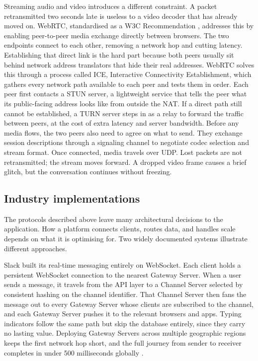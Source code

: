 \documentclass[12pt,a4paper]{article}
\begin{document}
Streaming audio and video introduces a different constraint. A packet retransmitted two seconds late is useless to a video decoder that has already moved on. WebRTC, standardised as a W3C Recommendation \citep{jennings2025}, addresses this by enabling peer-to-peer media exchange directly between browsers. The two endpoints connect to each other, removing a network hop and cutting latency. Establishing that direct link is the hard part because both peers usually sit behind network address translators that hide their real addresses. WebRTC solves this through a process called ICE, Interactive Connectivity Establishment, which gathers every network path available to each peer and tests them in order. Each peer first contacts a STUN server, a lightweight service that tells the peer what its public-facing address looks like from outside the NAT. If a direct path still cannot be established, a TURN server steps in as a relay to forward the traffic between peers, at the cost of extra latency and server bandwidth. Before any media flows, the two peers also need to agree on what to send. They exchange session descriptions through a signaling channel to negotiate codec selection and stream format. Once connected, media travels over UDP. Lost packets are not retransmitted; the stream moves forward. A dropped video frame causes a brief glitch, but the conversation continues without freezing.

\subsection{Industry implementations}

The protocols described above leave many architectural decisions to the application. How a platform connects clients, routes data, and handles scale depends on what it is optimising for. Two widely documented systems illustrate different approaches.

Slack built its real-time messaging entirely on WebSocket. Each client holds a persistent WebSocket connection to the nearest Gateway Server. When a user sends a message, it travels from the API layer to a Channel Server selected by consistent hashing on the channel identifier. That Channel Server then fans the message out to every Gateway Server whose clients are subscribed to the channel, and each Gateway Server pushes it to the relevant browsers and apps. Typing indicators follow the same path but skip the database entirely, since they carry no lasting value. Deploying Gateway Servers across multiple geographic regions keeps the first network hop short, and the full journey from sender to receiver completes in under 500 milliseconds globally \citep{thangudu2023}.
\end{document}
